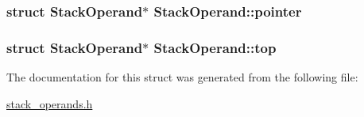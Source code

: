\subsubsection[{\texorpdfstring{pointer}{pointer}}]{\setlength{\rightskip}{0pt plus 5cm}struct {\bf Stack\+Operand}$\ast$ Stack\+Operand\+::pointer}\hypertarget{structStackOperand_af4ad4c3c4e49be261c61b3856bc02b9f}{}\label{structStackOperand_af4ad4c3c4e49be261c61b3856bc02b9f}
\subsubsection[{\texorpdfstring{top}{top}}]{\setlength{\rightskip}{0pt plus 5cm}struct {\bf Stack\+Operand}$\ast$ Stack\+Operand\+::top}\hypertarget{structStackOperand_a11a33c73ab08f65a14fb53af2308d052}{}\label{structStackOperand_a11a33c73ab08f65a14fb53af2308d052}


The documentation for this struct was generated from the following file\+:\begin{DoxyCompactItemize}
\item 
\hyperlink{stack__operands_8h}{stack\+\_\+operands.\+h}\end{DoxyCompactItemize}
